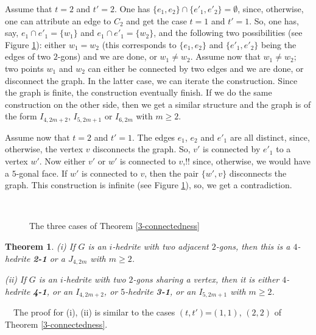 \documentclass[12pt]{article}
\newtheorem{theorem}{Theorem}
\newcommand{\proof}{\noindent{\bf Proof.}\ \ }
\begin{document}
Assume that $t=2$ and $t'=2$. One has $\{e_1, e_2\}\cap \{e'_1, e'_2\}=\emptyset$, since, otherwise, one can attribute an edge to $C_2$ and get the case
$t=1$ and $t'=1$. So, one has, say, $e_1\cap e'_1=\{w_1\}$ and 
$e_1\cap e'_1=\{w_2\}$, and the following two possibilities 
(see Figure \ref{fig:TheThreeCases}): either $w_1=w_2$ (this
corresponds to $\{e_1, e_2\}$ and $\{e'_1, e'_2\}$ being the edges
of two $2$-gons) and we are done, or $w_1\not= w_2$.
Assume now that $w_1\not= w_2$; two points $w_1$ and $w_2$ can 
either be connected by two edges and we are done, or disconnect the
graph. In the latter case, we can iterate the construction. Since the 
graph is finite, the construction eventually finish. If we do the same
construction on the other side, then we get a similar structure and the 
graph is of the form $I_{4,2m+2}$, $I_{5, 2m+1}$ or $I_{6,2m}$ with 
$m\geq 2$.


Assume now that $t=2$ and $t'=1$. The edges $e_1$, $e_2$ and $e'_1$ are
all distinct, since, otherwise, the vertex $v$ disconnects the graph.
So, $v'$ is connected by $e'_1$ to a vertex $w'$. Now either $v'$ or $w'$
is connected to $v$,!! since, otherwise, we would have a $5$-gonal face.
If $w'$ is connected to $v$, then the pair $\{w', v\}$ disconnects the graph.
This construction is infinite (see Figure \ref{fig:TheThreeCases}), so,
we get a contradiction.




\begin{figure}
\centering
\mbox{
}
\caption{The three cases of Theorem \ref{3-connectedness}}
\label{fig:TheThreeCases}
\end{figure}



\begin{theorem}
(i) If $G$ is an $i$-hedrite with two adjacent $2$-gons, then 
this is a $4$-hedrite {\bf 2-1} or a $J_{4,2m}$ with $m\geq 2$.

(ii) If $G$ is an $i$-hedrite with two $2$-gons sharing a vertex, then 
it is either $4$-hedrite {\bf 4-1}, or an $I_{4,2m+2}$, or $5$-hedrite 
{\bf 3-1}, or an $I_{5,2m+1}$ with $m\geq 2$.

\end{theorem}

\proof The proof for (i), (ii) is similar to the cases $(t,t')$=$(1,1)$, $(2,2)$ of Theorem \ref{3-connectedness}.
\end{document}
